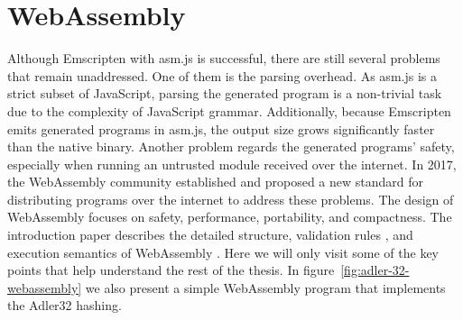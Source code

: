 \section{WebAssembly}

Although Emscripten with asm.js is successful, there are still several problems
that remain unaddressed. One of them is the parsing overhead. As asm.js is a
strict subset of JavaScript, parsing the generated program is a non-trivial task
due to the complexity of JavaScript grammar. Additionally, because Emscripten
emits generated programs in asm.js, the output size grows significantly faster
than the native binary. Another problem regards the generated programs' safety,
especially when running an untrusted module received over the internet. In 2017,
the WebAssembly community established and proposed a new standard for
distributing programs over the internet to address these problems. The design of
WebAssembly focuses on safety, performance, portability, and compactness. The
introduction paper describes the detailed structure, validation rules
\cite{10.1145/3167082}, and execution semantics of WebAssembly
\cite{10.1145/3062341.3062363}. Here we will only visit some of the key points
that help understand the rest of the thesis. In
figure~\ref{fig:adler-32-webassembly} we also present a simple WebAssembly
program that implements the Adler32 hashing.

